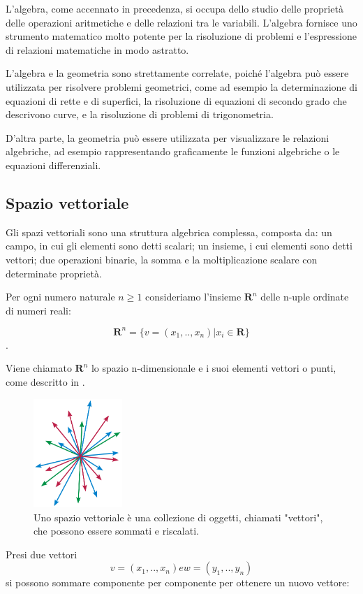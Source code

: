 L'algebra, come accennato in precedenza, si occupa dello studio delle proprietà delle operazioni aritmetiche e delle relazioni tra le variabili. L'algebra fornisce uno strumento matematico molto potente per la risoluzione di problemi e l'espressione di relazioni matematiche in modo astratto.

L'algebra e la geometria sono strettamente correlate, poiché l'algebra può essere utilizzata per risolvere problemi geometrici, come ad esempio la determinazione di equazioni di rette e di superfici, la risoluzione di equazioni di secondo grado che descrivono curve, e la risoluzione di problemi di trigonometria.

D'altra parte, la geometria può essere utilizzata per visualizzare le relazioni algebriche, ad esempio rappresentando graficamente le funzioni algebriche o le equazioni differenziali.

\subsection{Spazio vettoriale}\label{subsec:spazi_vettoriali}
Gli spazi vettoriali sono una struttura algebrica complessa, composta da: un campo, in cui gli elementi sono detti scalari; un insieme, i cui elementi sono detti vettori; due operazioni binarie, la somma e la moltiplicazione scalare con determinate proprietà. 

Per ogni numero naturale $n \ge 1$ consideriamo l'insieme $\mathbf{R}^n$ delle n-uple ordinate di numeri reali: 

	$$\mathbf{R}^n = \{v = (x_1, .., x_n)| x_i \in \mathbf{R}\}$$.

Viene chiamato $\mathbf{R}^n$ lo spazio n-dimensionale e i suoi elementi vettori o punti, come descritto in \cite{Algebra}. 
\begin{figure}
	\centering
	\includegraphics[width=0.3\textwidth]{Immagini/SpazioVettoriale.png}
	\caption{Uno spazio vettoriale è una collezione di oggetti, chiamati "vettori", che possono essere sommati e riscalati.}
	\label{fig:vettori}
\end{figure}
Presi due vettori $$v = (x_1, .., x_n) e w = (y_1, .., y_n)$$ si possono sommare componente per componente per ottenere un nuovo vettore: 

